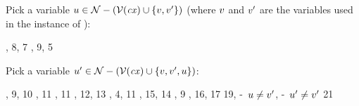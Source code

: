 \begin{bycase}
\Case{\Rstarr}
\begin{derivation}
\step{\istyO{\typ}}{\premof{\Rstarr}}
\end{derivation}
Pick a variable $u\in\mathcal{N}-(\mathcal{V}(\mathit{cx})\cup\{v,v'\})$ (where $v$
and $v'$ are the variables used in the instance of \Rstarr):
\begin{derivatioN}{8}
     {\Rcxvdec, 8, 7}
     {, 9, 5}
\end{derivatioN}
Pick a variable $u'\in\mathcal{N}-(\mathcal{V}(\mathit{cx})\cup\{v,v',u\})$:
\begin{derivatioN}{10}
     {\Rcxvdec, 9, 10}
     {\Revar, 11}
     {\Revar, 11}
     {\Reapp, 12, 13}
     {, 4, 11}
     {\Reapp, 15, 14}
     {\Rtbool, 9}
     {\Reabs, 16, 17}
     {19, \hyp\ $u\neq v'$, \hyp\ $u'\neq v'$}
\steP
{
 \linK{=}
 \cup{}\cup{}
 \emptyset}
     {21}
\end{derivatioN}
\end{bycase}
